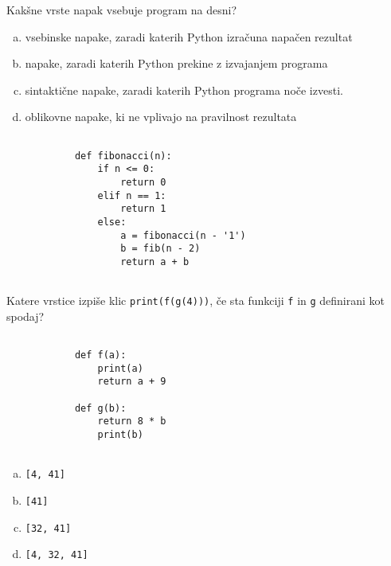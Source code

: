 \documentclass[arhiv, 10pt]{../izpit}
\newcommand{\inlinepy}[1]{\texttt{#1}}
\begin{document}
        \naloga*
        \begin{multicols}{2}
        \noindent
        Kakšne vrste napak vsebuje program na desni?

        \begin{enumerate}[(a)]
\item vsebinske napake, zaradi katerih Python izračuna napačen rezultat
\item napake, zaradi katerih Python prekine z izvajanjem programa
\item sintaktične napake, zaradi katerih Python programa noče izvesti.
\item oblikovne napake, ki ne vplivajo na pravilnost rezultata
\end{enumerate}

        \columnbreak

        \begin{verbatim}
        
            def fibonacci(n):
                if n <= 0:
                    return 0
                elif n == 1:
                    return 1
                else:
                    a = fibonacci(n - '1')
                    b = fib(n - 2)
                    return a + b
            
        \end{verbatim}

        \end{multicols}

    
        \naloga*
        Katere vrstice izpiše klic \inlinepy{print(f(g(4)))}, če sta funkciji \inlinepy{f} in \inlinepy{g} definirani kot spodaj?

        \begin{multicols}{2}
        \begin{verbatim}
        
            def f(a):
                print(a)
                return a + 9

            def g(b):
                return 8 * b
                print(b)
        
        \end{verbatim}

        \begin{enumerate}[(a)]
\item \inlinepy{[4, 41]}
\item \inlinepy{[41]}
\item \inlinepy{[32, 41]}
\item \inlinepy{[4, 32, 41]}
\end{enumerate}

        \end{multicols}
    
\end{document}
